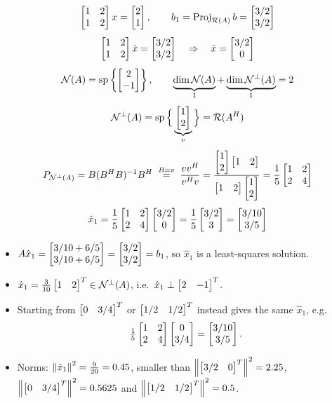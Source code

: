 \begin{example}
\begin{gather*}
\bmat{1&2\\1&2}x = \bmat{2\\1}, \qquad
b_1 = \operatorname{Proj}_{\Range(A)} b = \bmat{3/2\\3/2}\\[4pt]
\bmat{1&2\\1&2}\hat x = \bmat{3/2\\3/2}
\quad\Rightarrow\quad
\hat x = \bmat{3/2\\0}\\[4pt]
\Null(A) = \Span\left\{\bmat{2\\-1}\right\}, \qquad
\underbrace{\dim\Null(A)}_{1} + \underbrace{\dim\Null^\perp(A)}_{1} = 2\\[4pt]
\Null^\perp(A) = \Span\Big\{\underbrace{\bmat{1\\2}}_{v}\Big\} = \Range(A\Hm)\\[4pt]
P_{\Null^\perp(A)} = B(B\Hm B)^{-1}B\Hm \;\overset{B=v}{=}\; \frac{vv\Hm}{v\Hm v}
= \frac{\bmat{1\\2}\bmat{1&2}}{\bmat{1&2}\bmat{1\\2}} = \frac15\bmat{1&2\\2&4}\\[4pt]
\hat x_1 = \frac15\bmat{1&2\\2&4}\bmat{3/2\\0} = \frac15\bmat{3/2\\3} = \bmat{3/10\\3/5}
\end{gather*}
\begin{insight}
\begin{itemize}[nosep]
  \item $A\hat x_1 = \bmat{3/10+6/5\\ 3/10+6/5} = \bmat{3/2\\3/2} = b_1$, so $\hat x_1$ is a least-squares solution.
  \item $\hat x_1 = \tfrac{3}{10}\bmat{1 & 2}\T\in\Null^\perp(A)$, i.e.\ $\hat x_1\perp\bmat{2 & -1}\T$.
  \item Starting from $\bmat{0 & 3/4}\T$ or $\bmat{1/2 & 1/2}\T$ instead gives the same $\hat x_1$, e.g.
        \[
        \tfrac15\bmat{1&2\\2&4}\bmat{0\\3/4} = \bmat{3/10\\3/5}.
        \]
  \item Norms: $\norm{\hat x_1}^2 = \tfrac{9}{20} = 0.45$, smaller than
        $\norm{\bmat{3/2 & 0}\T}^2 = 2.25$, $\norm{\bmat{0 & 3/4}\T}^2 = 0.5625$ and $\norm{\bmat{1/2 & 1/2}\T}^2 = 0.5$.
\end{itemize}
\end{insight}
\end{example}

